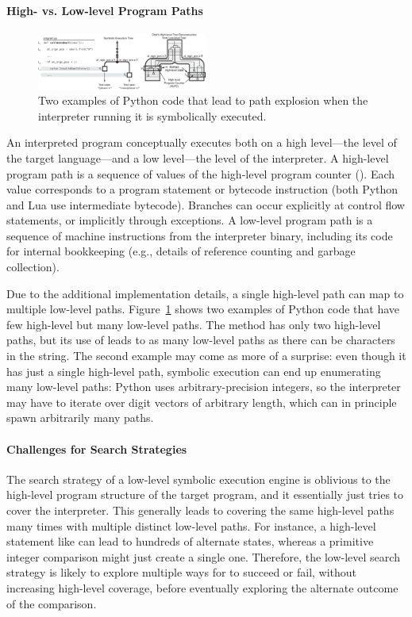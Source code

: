 \paragraph{High- vs. Low-level Program Paths}

\begin{figure}
  \centering
  \includegraphics[width=2.2in]{chef/figures/running-example}
  \caption{Two examples of Python code that lead to path explosion when the interpreter running it is symbolically executed.}
  \label{fig:running-examples}
\end{figure}


An interpreted program conceptually executes both on a high level---the level of the target language---and a low level---the level of the interpreter.
%
A high-level program path is a sequence of values of the high-level program counter (\hlpc). Each \hlpc value corresponds to a program statement or bytecode instruction (both Python and Lua use intermediate bytecode).  Branches can occur explicitly at control flow statements, or implicitly through exceptions.
%
A low-level program path is a sequence of machine instructions from the interpreter binary, including its code for internal bookkeeping (e.g., details of reference counting and garbage collection).

Due to the additional implementation details, a single high-level path can map to multiple low-level paths.
%
Figure~\ref{fig:running-examples} shows two examples of Python code that have few high-level but many low-level paths. The  method has only two high-level paths, but its use of  leads to as many low-level paths as there can be characters in the  string.
%
The second example  may come as more of a surprise: even though it has just a single high-level path, symbolic execution can end up enumerating many low-level paths: Python uses arbitrary-precision integers, so the interpreter may have to iterate over digit vectors of arbitrary length, which can in principle spawn arbitrarily many paths.


\paragraph{Challenges for Search Strategies}
%
The search strategy of a low-level symbolic execution engine is oblivious to the high-level program structure of the target program, and it essentially just tries to cover the interpreter. This generally leads to covering the same high-level paths many times with multiple distinct low-level paths.
%
For instance, a high-level statement like  can lead to hundreds of alternate states, whereas a primitive integer comparison might just create a single one. Therefore, the low-level search strategy is likely to explore multiple ways for  to succeed or fail, without increasing high-level coverage, before eventually exploring the alternate outcome of the comparison.

